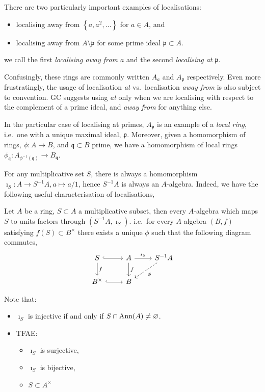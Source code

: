 \documentclass[000-main.tex]{subfiles}
\begin{document}
There are two particularly important examples of localisations:
\begin{itemize}
  \item localising away from $\left\{a, a^2, \ldots \right\}$ for $a\in A$, and
  \item localising away from $A\setminus\mathfrak{p}$ for some prime ideal $\mathfrak{p}\subset A$.
\end{itemize}
we call the first \emph{localising away from $a$} and the second \emph{localising at $\mathfrak{p}$}.

Confusingly, these rings are commonly written $A_a$ and $A_{\mathfrak{p}}$ respectively.
Even more frustratingly, the usage of localisation \emph{at} vs.\ localisation \emph{away from} is also subject to convention.
GC suggests using \emph{at} only when we are localising with respect to the complement of a prime ideal, and \emph{away from} for anything else.

In the particular case of localising at primes, $A_\mathfrak{p}$ is an example of a \emph{local ring}, i.e.\ one with a unique maximal ideal, $\mathfrak{p}$.
Moreover, given a homomorphism of rings, $\phi : A \to B$, and $\mathfrak{q}\subset B$ prime, we have a homomorphism of local rings $\phi_{\mathfrak{q}} : A_{\phi^{-1}(\mathfrak{q})} \to B_{\mathfrak{q}}$.

For any multiplicative set $S$, there is always a homomorphism $\imath_S: A \to S^{-1}A, a\mapsto a/1$, hence $S^{-1}A$ is always an $A$-algebra.
Indeed, we have the following useful characterisation of localisations,
\begin{lemma}
  Let $A$ be a ring, $S\subset A$ a multiplicative subset, then every $A$-algebra which maps $S$ to units factors through $(S^{-1}A, \imath_S)$.
  i.e.\ for every $A$-algebra $(B, f)$ satisfying $f(S)\subset B^{\times}$ there exists a unique $\phi$ such that the following diagram commutes,
  \begin{displaymath}
    \begin{tikzcd}
      S \rar[hook] \dar{f} & A \dar{f} \rar{\imath_S} & S^{-1}A \dlar[dashed]{\phi}\\
      B^{\times} \rar[hook] & B
    \end{tikzcd}
  \end{displaymath}

\end{lemma}
Note that:
\begin{itemize}
  \item $\imath_S$ is injective if and only if $S\cap \operatorname{Ann}(A) \neq \varnothing$.
  \item TFAE:
        \begin{itemize}
          \item $\imath_S$ is surjective,
          \item $\imath_S$ is bijective,
          \item $S \subset A^{\times}$
        \end{itemize}
\end{itemize}
\end{document}
